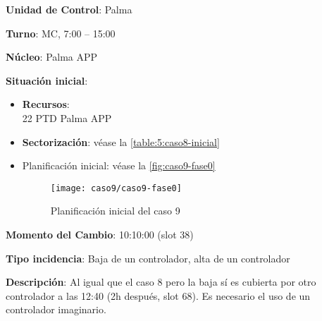 \textbf{Unidad de Control}: Palma

\textbf{Turno}: MC, 7:00 -- 15:00

\textbf{Núcleo}: Palma APP

\textbf{Situación inicial}:
\begin{itemize}[label={}]
	
	\item \textbf{Recursos}: \\
	22 PTD Palma APP \\
	
	\item \textbf{Sectorización}: véase la \autoref{table:5:caso8-inicial}
	
	\item Planificación inicial: véase la \autoref{fig:caso9-fase0}
	
	\begin{figure}[!h]
		\centering
		\texttt{[image: caso9/caso9-fase0]}
		\caption{Planificación inicial del caso 9}
		\label{fig:caso9-fase0}
	\end{figure}
	
\end{itemize}

\textbf{Momento del Cambio}: 10:10:00 (slot 38)

\textbf{Tipo incidencia}: Baja de un controlador, alta de un controlador

\textbf{Descripción}: Al igual que el caso 8 pero la baja sí es cubierta por otro controlador a las 12:40 (2h después, slot 68). Es necesario el uso de un controlador imaginario.